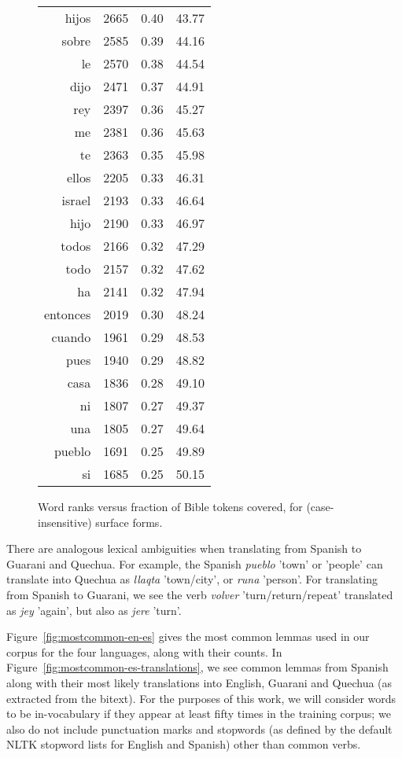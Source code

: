 \begin{figure*}
\begin{tiny}
\begin{centering}
\begin{tabular}{|r|c|c|c|}
hijos & 2665 & 0.40 & 43.77 \\
sobre & 2585 & 0.39 & 44.16 \\
le & 2570 & 0.38 & 44.54 \\
dijo & 2471 & 0.37 & 44.91 \\
rey & 2397 & 0.36 & 45.27 \\
me & 2381 & 0.36 & 45.63 \\
te & 2363 & 0.35 & 45.98 \\
ellos & 2205 & 0.33 & 46.31 \\
israel & 2193 & 0.33 & 46.64 \\
hijo & 2190 & 0.33 & 46.97 \\
todos & 2166 & 0.32 & 47.29 \\
todo & 2157 & 0.32 & 47.62 \\
ha & 2141 & 0.32 & 47.94 \\
entonces & 2019 & 0.30 & 48.24 \\
cuando & 1961 & 0.29 & 48.53 \\
pues & 1940 & 0.29 & 48.82 \\
casa & 1836 & 0.28 & 49.10 \\
ni & 1807 & 0.27 & 49.37 \\
una & 1805 & 0.27 & 49.64 \\
pueblo & 1691 & 0.25 & 49.89 \\
si & 1685 & 0.25 & 50.15 \\
\hline
\end{tabular}
\end{centering}
\end{tiny}

  \caption{Word ranks versus fraction of Bible tokens covered, for
  (case-insensitive) surface forms.}
  \label{fig:mostcommon-surface}
\end{figure*}

There are analogous lexical ambiguities when translating from Spanish to
Guarani and Quechua.
For example, the Spanish \emph{pueblo} 'town' or 'people' can translate into
Quechua as \emph{llaqta} 'town/city', or \emph{runa} 'person'.
For translating from Spanish to Guarani, we see the verb \emph{volver}
'turn/return/repeat' translated as \emph{jey} 'again', but also as \emph{jere}
'turn'.

Figure~\ref{fig:mostcommon-en-es} gives the most common lemmas used in our
corpus for the four languages, along with their counts. In
Figure~\ref{fig:mostcommon-es-translations}, we see common lemmas from
Spanish along with their most likely translations into English, Guarani and
Quechua (as extracted from the bitext). For the purposes of this work, we will
consider words to be in-vocabulary if they appear at least fifty times in the
training corpus; we also do not include punctuation marks and stopwords (as
defined by the default NLTK stopword lists for English and Spanish) other than
common verbs.

